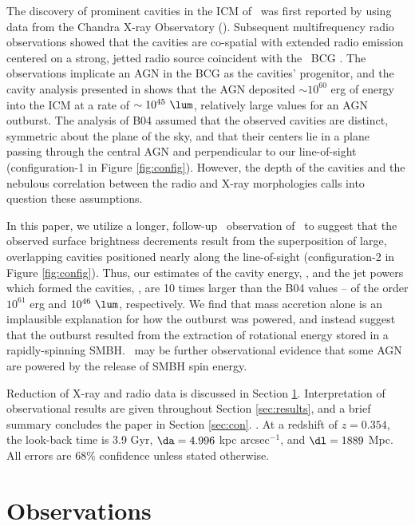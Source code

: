 \documentclass[iop]{emulateapj}
\begin{document}
The discovery of prominent cavities in the ICM of \rbs\ was first
reported by \citet{schindler01} using data from the Chandra X-ray
Observatory (\cxo). Subsequent multifrequency radio observations
showed that the cavities are co-spatial with extended radio emission
centered on a strong, jetted radio source coincident with the
\rbs\ BCG \citep{2002astro.ph..1349D, gitti06, birzan08}. The
observations implicate an AGN in the BCG as the cavities' progenitor,
and the cavity analysis presented in \citet[][hereafter B04]{birzan04}
shows that the AGN deposited $\sim 10^{60}$ erg of energy into the ICM
at a rate of $\sim 10^{45} ~\lum$, relatively large values for an AGN
outburst. The analysis of B04 assumed that the observed cavities are
distinct, symmetric about the plane of the sky, and that their centers
lie in a plane passing through the central AGN and perpendicular to
our line-of-sight (configuration-1 in Figure
\ref{fig:config}). However, the depth of the cavities and the nebulous
correlation between the radio and X-ray morphologies calls into
question these assumptions.

In this paper, we utilize a longer, follow-up \cxo\ observation of
\rbs\ to suggest that the observed surface brightness decrements
result from the superposition of large, overlapping cavities
positioned nearly along the line-of-sight (configuration-2 in Figure
\ref{fig:config}). Thus, our estimates of the cavity energy, \ecav,
and the jet powers which formed the cavities, \pjet, are 10 times
larger than the B04 values -- of the order $10^{61}$ erg and $10^{46}
~\lum$, respectively. We find that mass accretion alone is an
implausible explanation for how the outburst was powered, and instead
suggest that the outburst resulted from the extraction of rotational
energy stored in a rapidly-spinning SMBH. \rbs\ may be further
observational evidence that some AGN are powered by the release of
SMBH spin energy.

Reduction of X-ray and radio data is discussed in Section
\ref{sec:obs}. Interpretation of observational results are given
throughout Section \ref{sec:results}, and a brief summary concludes
the paper in Section \ref{sec:con}. \LCDM. At a redshift of $z =
0.354$, the look-back time is 3.9 Gyr, $\da = 4.996$ kpc
arcsec$^{-1}$, and $\dl = 1889$ Mpc. All errors are 68\% confidence
unless stated otherwise.

\section{Observations}
\label{sec:obs}
\end{document}
